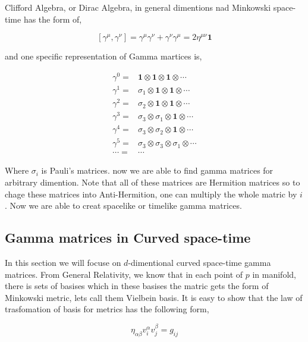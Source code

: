 Clifford Algebra, or Dirac Algebra, in general dimentions nad Minkowski space-time has the form of,

\begin{equation}
   \left[\gamma^{\mu},\gamma^{\nu}\right] = \gamma^{\mu}\gamma^{\nu} + \gamma^{\nu}\gamma^{\mu} = 2\eta^{\mu\nu}\mathbf{1}
\end{equation}

and one specific representation of Gamma martices is,

\begin{align}
   \gamma^{0} =& \mathbf{1}\otimes\mathbf{1}\otimes\mathbf{1}\otimes\cdots \nonumber\\
   \gamma^{1} =& \sigma_1\otimes\mathbf{1}\otimes\mathbf{1}\otimes\cdots \nonumber\\
   \gamma^{2} =& \sigma_2\otimes\mathbf{1}\otimes\mathbf{1}\otimes\cdots \nonumber\\
   \gamma^{3} =& \sigma_3\otimes\sigma_1\otimes\mathbf{1}\otimes\cdots   \nonumber\\
   \gamma^{4} =& \sigma_3\otimes\sigma_2\otimes\mathbf{1}\otimes\cdots   \nonumber\\
   \gamma^{5} =& \sigma_3\otimes\sigma_3\otimes\sigma_1\otimes\cdots     \nonumber\\
   \cdots     =& \cdots
\end{align}

Where $\sigma_i$ is Pauli's matrices. now we are able to find gamma matrices for arbitrary dimention. Note that all of these matrices are Hermition matrices so to chage these matrices into Anti-Hermition, one can multiply the whole matric by $i$. Now we are able to creat spacelike or timelike gamma matrices.

\subsection{Gamma matrices in Curved space-time}

In this section we will focuse on $d$-dimentional curved space-time gamma matrices. From General Relativity, we know that in each point of $p$ in manifold, there is sets of basises which in these basises the matric gets the form of Minkowski metric, lets call them Vielbein basis. It is easy to show that the law of trasfomation of basis for metrics has the following form,

\begin{equation}
   \eta_{\alpha\beta} v^{\alpha}_i v^{\beta}_j = g_{ij}
\end{equation}

